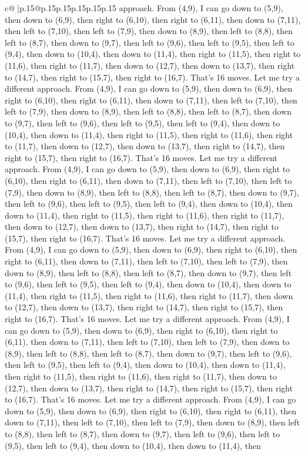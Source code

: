 \documentclass{article}
\begin{document}
{\begin{supertabular}{c@{$\;$}|p{.15\linewidth}@{}p{.15\linewidth}p{.15\linewidth}p{.15\linewidth}p{.15\linewidth}p{.15\linewidth}}
{{{approach. From (4,9), I can go down to (5,9), then down to (6,9), then right to (6,10), then right to (6,11), then down to (7,11), then left to (7,10), then left to (7,9), then down to (8,9), then left to (8,8), then left to (8,7), then down to (9,7), then left to (9,6), then left to (9,5), then left to (9,4), then down to (10,4), then down to (11,4), then right to (11,5), then right to (11,6), then right to (11,7), then down to (12,7), then down to (13,7), then right to (14,7), then right to (15,7), then right to (16,7). That's 16 moves. Let me try a different approach. From (4,9), I can go down to (5,9), then down to (6,9), then right to (6,10), then right to (6,11), then down to (7,11), then left to (7,10), then left to (7,9), then down to (8,9), then left to (8,8), then left to (8,7), then down to (9,7), then left to (9,6), then left to (9,5), then left to (9,4), then down to (10,4), then down to (11,4), then right to (11,5), then right to (11,6), then right to (11,7), then down to (12,7), then down to (13,7), then right to (14,7), then right to (15,7), then right to (16,7). That's 16 moves. Let me try a different approach. From (4,9), I can go down to (5,9), then down to (6,9), then right to (6,10), then right to (6,11), then down to (7,11), then left to (7,10), then left to (7,9), then down to (8,9), then left to (8,8), then left to (8,7), then down to (9,7), then left to (9,6), then left to (9,5), then left to (9,4), then down to (10,4), then down to (11,4), then right to (11,5), then right to (11,6), then right to (11,7), then down to (12,7), then down to (13,7), then right to (14,7), then right to (15,7), then right to (16,7). That's 16 moves. Let me try a different approach. From (4,9), I can go down to (5,9), then down to (6,9), then right to (6,10), then right to (6,11), then down to (7,11), then left to (7,10), then left to (7,9), then down to (8,9), then left to (8,8), then left to (8,7), then down to (9,7), then left to (9,6), then left to (9,5), then left to (9,4), then down to (10,4), then down to (11,4), then right to (11,5), then right to (11,6), then right to (11,7), then down to (12,7), then down to (13,7), then right to (14,7), then right to (15,7), then right to (16,7). That's 16 moves. Let me try a different approach. From (4,9), I can go down to (5,9), then down to (6,9), then right to (6,10), then right to (6,11), then down to (7,11), then left to (7,10), then left to (7,9), then down to (8,9), then left to (8,8), then left to (8,7), then down to (9,7), then left to (9,6), then left to (9,5), then left to (9,4), then down to (10,4), then down to (11,4), then right to (11,5), then right to (11,6), then right to (11,7), then down to (12,7), then down to (13,7), then right to (14,7), then right to (15,7), then right to (16,7). That's 16 moves. Let me try a different approach. From (4,9), I can go down to (5,9), then down to (6,9), then right to (6,10), then right to (6,11), then down to (7,11), then left to (7,10), then left to (7,9), then down to (8,9), then left to (8,8), then left to (8,7), then down to (9,7), then left to (9,6), then left to (9,5), then left to (9,4), then down to (10,4), then down to (11,4), then }}}
\end{supertabular}}
\end{document}
